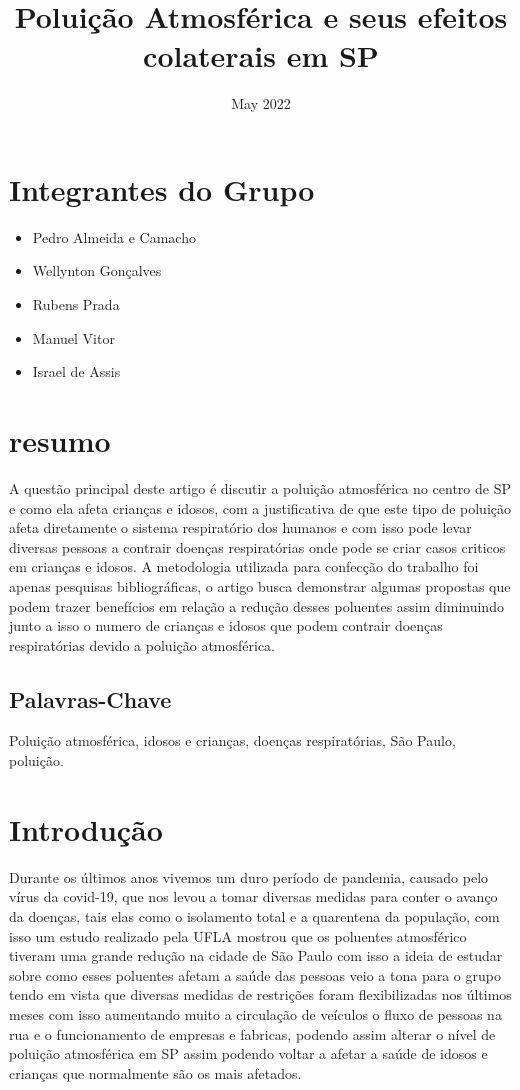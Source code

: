 \documentclass[
	article,			%
	11pt,				%
	oneside,			%
	a4paper,			%
	english,			%
	brazil,				%
	sumario=tradicional
	]{abntex2}
\title{Poluição Atmosférica e seus efeitos colaterais em SP}
\date{May 2022}
\begin{document}
\maketitle

\section*{Integrantes do Grupo}
\begin{itemize}
    \item Pedro Almeida e Camacho
    \item Wellynton Gonçalves
    \item Rubens Prada 
    \item Manuel Vitor
    \item Israel de Assis
\end{itemize}


\section{resumo}
A questão principal deste artigo é discutir a poluição atmosférica no centro de SP e como ela afeta crianças e idosos, com a justificativa de que este tipo de poluição afeta diretamente o sistema respiratório dos humanos e com isso pode levar diversas pessoas a contrair doenças respiratórias onde pode se criar casos criticos em crianças e idosos. A metodologia utilizada para confecção do trabalho foi apenas pesquisas bibliográficas, o artigo busca demonstrar algumas propostas que podem trazer benefícios em relação a redução desses poluentes assim diminuindo junto a isso o numero de crianças e idosos que podem contrair doenças respiratórias devido a poluição atmosférica.
\subsection{Palavras-Chave}
Poluição atmosférica, idosos e crianças, doenças respiratórias, São Paulo, poluição.



\section{Introdução}
Durante os últimos anos vivemos um duro período de pandemia, causado pelo vírus da covid-19, que nos levou a tomar diversas medidas para conter o avanço da doenças, tais elas como o isolamento total e a quarentena da população, com isso um estudo realizado pela UFLA mostrou que os poluentes atmosférico tiveram uma grande redução na cidade de São Paulo  com isso a ideia de estudar sobre como esses poluentes afetam a saúde das pessoas veio a tona para o grupo tendo em vista que diversas medidas de restrições foram flexibilizadas nos últimos meses com isso aumentando muito a circulação de veículos o fluxo de pessoas na rua e o funcionamento de empresas e fabricas, podendo assim alterar o nível de poluição atmosférica em SP assim podendo voltar a afetar a saúde de idosos e crianças que normalmente são os mais afetados.
\end{document}
